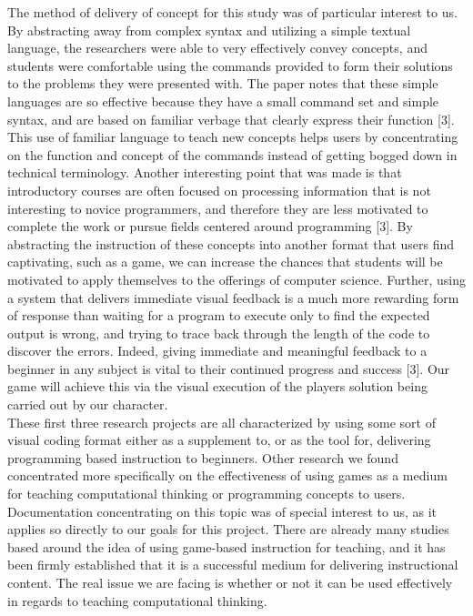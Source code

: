 The method of delivery of concept for this study was of particular interest to us. By abstracting away from complex syntax and utilizing a simple textual language, the researchers were able to very effectively convey concepts, and students were comfortable using the commands provided to form their solutions to the problems they were presented with. The paper notes that these simple languages are so effective because they have a small command set and simple syntax, and are based on familiar verbage that clearly express their function [3]. This use of familiar language to teach new concepts helps users by concentrating on the function and concept of the commands instead of getting bogged down in technical terminology. Another interesting point that was made is that introductory courses are often focused on processing information that is not interesting to novice programmers, and therefore they are less motivated to complete the work or pursue fields centered around programming [3]. By abstracting the instruction of these concepts into another format that users find captivating, such as a game, we can increase the chances that students will be motivated to apply themselves to the offerings of computer science. Further, using a system that delivers immediate visual feedback is a much more rewarding form of response than waiting for a program to execute only to find the expected output is wrong, and trying to trace back through the length of the code to discover the errors. Indeed, giving immediate and meaningful feedback to a beginner in any subject is vital to their continued progress and success [3]. Our game will achieve this via the visual execution of the players solution being carried out by our character. \\

These first three research projects are all characterized by using some sort of visual coding format either as a supplement to, or as the tool for, delivering programming based instruction to beginners. Other research we found concentrated more specifically on the effectiveness of using games as a medium for teaching computational thinking or programming concepts to users. Documentation concentrating on this topic was of special interest to us, as it applies so directly to our goals for this project. There are already many studies based around the idea of using game-based instruction for teaching, and it has been firmly established that it is a successful medium for delivering instructional content. The real issue we are facing is whether or not it can be used effectively in regards to teaching computational thinking.\\


